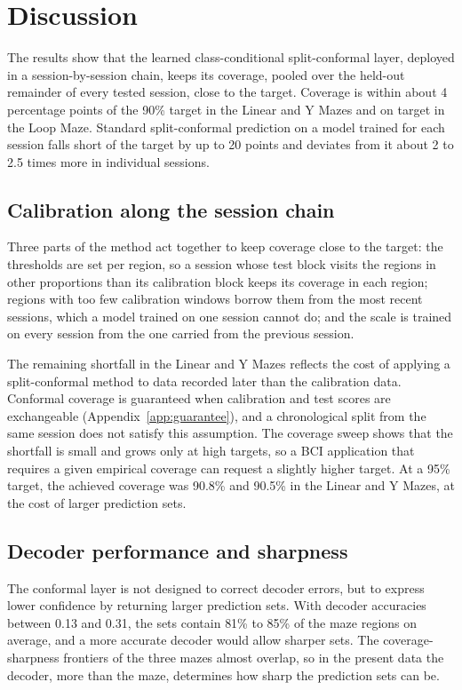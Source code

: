 \documentclass{article}
\begin{document}
\FloatBarrier
\section{Discussion}
The results show that the learned class-conditional split-conformal layer, deployed in a session-by-session chain, keeps its coverage, pooled over the held-out remainder of every tested session, close to the target. Coverage is within about 4 percentage points of the 90\% target in the Linear and Y Mazes and on target in the Loop Maze. Standard split-conformal prediction on a model trained for each session falls short of the target by up to 20 points and deviates from it about 2 to 2.5 times more in individual sessions.

\subsection{Calibration along the session chain}
Three parts of the method act together to keep coverage close to the target: the thresholds are set per region, so a session whose test block visits the regions in other proportions than its calibration block keeps its coverage in each region; regions with too few calibration windows borrow them from the most recent sessions, which a model trained on one session cannot do; and the scale is trained on every session from the one carried from the previous session.

The remaining shortfall in the Linear and Y Mazes reflects the cost of applying a split-conformal method to data recorded later than the calibration data. Conformal coverage is guaranteed when calibration and test scores are exchangeable (Appendix~\ref{app:guarantee}), and a chronological split from the same session does not satisfy this assumption. The coverage sweep shows that the shortfall is small and grows only at high targets, so a BCI application that requires a given empirical coverage can request a slightly higher target. At a 95\% target, the achieved coverage was 90.8\% and 90.5\% in the Linear and Y Mazes, at the cost of larger prediction sets.

\subsection{Decoder performance and sharpness}
The conformal layer is not designed to correct decoder errors, but to express lower confidence by returning larger prediction sets. With decoder accuracies between 0.13 and 0.31, the sets contain 81\% to 85\% of the maze regions on average, and a more accurate decoder would allow sharper sets. The coverage-sharpness frontiers of the three mazes almost overlap, so in the present data the decoder, more than the maze, determines how sharp the prediction sets can be.
\end{document}
